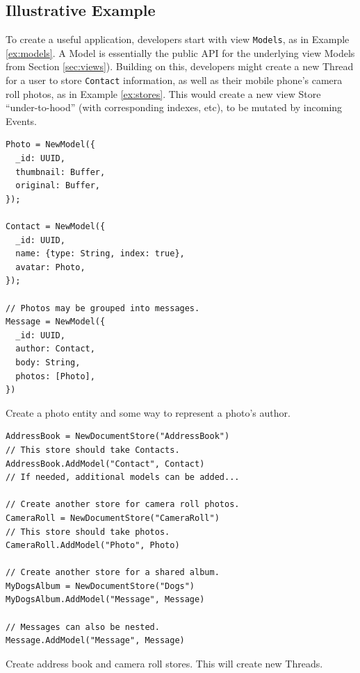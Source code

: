 \documentclass{textile}
\begin{document}
\subsection{Illustrative Example}\label{sec:example}


To create a useful application, developers start with view \texttt{Models}, as in Example \ref{ex:models}. A Model is essentially the public API for the underlying view Models from Section \ref{sec:views}). Building on this, developers might create a new Thread for a user to store \texttt{Contact} information, as well as their mobile phone's camera roll photos, as in Example \ref{ex:stores}. This would create a new view Store ``under-to-hood'' (with corresponding indexes, etc), to be mutated by incoming Events.

\begin{example}
  \begin{minipage}{.45\textwidth}
    \begin{lstlisting}
Photo = NewModel({
  _id: UUID,
  thumbnail: Buffer,
  original: Buffer,
});

Contact = NewModel({
  _id: UUID,
  name: {type: String, index: true},
  avatar: Photo,
});

// Photos may be grouped into messages.
Message = NewModel({
  _id: UUID,
  author: Contact,
  body: String,
  photos: [Photo],
})
    \end{lstlisting}
  \end{minipage}
  \caption{Create a photo entity and some way to represent a photo's author.}
  \label{ex:models}
\end{example}

\begin{example}
  \begin{minipage}{.45\textwidth}
    \begin{lstlisting}
AddressBook = NewDocumentStore("AddressBook")
// This store should take Contacts.
AddressBook.AddModel("Contact", Contact)
// If needed, additional models can be added...

// Create another store for camera roll photos.
CameraRoll = NewDocumentStore("CameraRoll")
// This store should take photos.
CameraRoll.AddModel("Photo", Photo)

// Create another store for a shared album.
MyDogsAlbum = NewDocumentStore("Dogs")
MyDogsAlbum.AddModel("Message", Message)

// Messages can also be nested.
Message.AddModel("Message", Message)
    \end{lstlisting}
  \end{minipage}
  \caption{Create address book and camera roll stores. This will create new Threads.}
  \label{ex:stores}
\end{example}
\end{document}
